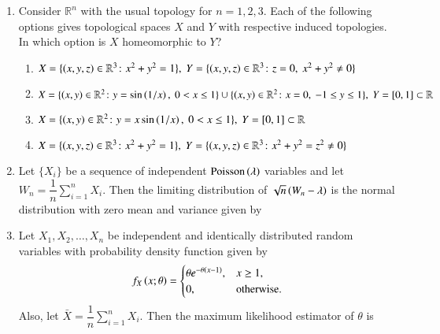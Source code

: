 \documentclass[journal,12pt,onecolumn]{IEEEtran}
\theoremstyle{remark}
\begin{document}
\begin{enumerate}[start=10]
\item Consider $\mathbb{R}^n$ with the usual topology for $n = 1, 2, 3$. Each of the following options gives
topological spaces $X$ and $Y$ with respective induced topologies. In which option is $X$ homeomorphic to $Y$?

\hfill{}
\begin{enumerate}
\item $X = \{\left(x, y, z\right) \in \mathbb{R}^3 \colon x^{2} + y^{2} = 1\},\ Y = \{\left(x, y, z\right) \in \mathbb{R}^3 \colon z = 0,\ x^{2} + y^{2} \ne 0\}$
\item $X = \{\left(x, y\right) \in \mathbb{R}^{2} \colon y = \sin\left(1/x\right),\ 0 < x \le 1\}\cup\{\left(x, y\right) \in \mathbb{R}^{2} \colon x = 0,\ -1 \le y \le 1\},\ Y = [0, 1] \subset \mathbb{R}$
\item $X = \{\left(x, y\right) \in \mathbb{R}^{2} \colon y = x\sin\left(1/x\right),\ 0 < x \le 1\},\ Y = [0, 1] \subset \mathbb{R}$
\item $X = \{\left(x, y, z\right) \in \mathbb{R}^3 \colon x^{2} + y^{2} = 1\},\ Y = \{\left(x, y, z\right) \in \mathbb{R}^3 \colon x^{2} + y^{2} = z^{2} \ne 0\}$
\end{enumerate}
\newpage
\item Let $\{X_i\}$ be a sequence of independent $\text{Poisson}\left(\lambda\right)$ variables and let $W_n = \dfrac{1}{n}\sum_{i=1}^{n} X_i$. Then
the limiting distribution of $\sqrt{n}\left(W_n - \lambda\right)$ is the normal distribution with zero mean and variance
given by

\hfill{}
\begin{enumerate}
\end{enumerate}

\item Let $X_1, X_2, \ldots, X_n$ be independent and identically distributed random variables with probability
density function given by
\begin{align*}
f_X\left(x;\theta\right) =
\begin{cases}
\theta e^{-\theta\left(x- 1\right)}, & x \ge 1,\\
0, & \text{otherwise.}
\end{cases}
\end{align*}
Also, let $\bar{X} = \dfrac{1}{n}\sum_{i=1}^{n} X_i$. Then the maximum likelihood estimator of $\theta$ is


\end{enumerate}
\end{document}
